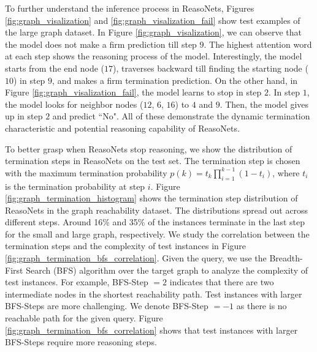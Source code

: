\documentclass[sigconf]{acmart}
\begin{document}
To further understand the inference process in ReasoNets, Figures \ref{fig:graph_visalization} and \ref{fig:graph_visalization_fail} show test examples of the large graph dataset. In Figure \ref{fig:graph_visalization}, we can observe that the model does not make a firm prediction till step $9$. The highest attention word at each step shows the reasoning process of the model. Interestingly, the model starts from the end node ($17$), traverses backward till finding the starting node ($10$) in step $9$, and makes a firm termination prediction. On the other hand, in Figure \ref{fig:graph_visalization_fail}, the model learns to stop in step $2$. In step $1$, the model looks for neighbor nodes ($12$, $6$, $16$) to $4$ and $9$. Then, the model gives up in step $2$ and predict ``No". All of these demonstrate the dynamic termination characteristic and potential reasoning capability of ReasoNets.


To better grasp when ReasoNets stop reasoning, we show the distribution of termination steps in ReasoNets on the test set. %
The termination step is chosen with the maximum termination probability $p(k) = t_k \prod_{i=1}^{k-1}{(1-t_i)}$, where $t_i$ is the termination probability at step $i$.
Figure \ref{fig:graph_termination_histogram} shows the termination step distribution of ReasoNets in the graph reachability dataset. 
The distributions spread out across different steps. Around 16\% and 35\% of the instances terminate in the last step for the small and large graph, respectively.
We study the correlation between the termination steps and the complexity of test instances in Figure \ref{fig:graph_termination_bfs_correlation}. 
Given the query, we use the Breadth-First Search (BFS) algorithm over the target graph to analyze the complexity of test instances.
For example, BFS-Step $ = 2$ indicates that there are two intermediate nodes in the shortest reachability path. Test instances with larger BFS-Steps are more challenging. We denote BFS-Step $ = -1$ as there is no reachable path for the given query. Figure \ref{fig:graph_termination_bfs_correlation} shows that test instances with larger BFS-Steps require more reasoning steps.
\end{document}
